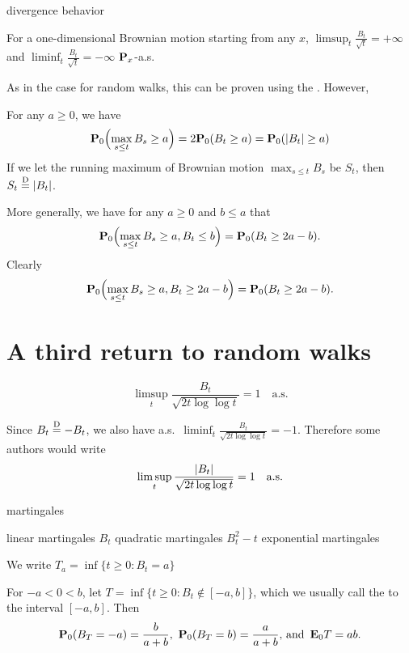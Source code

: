 divergence behavior
\begin{thm}
    For a one-dimensional Brownian motion starting from any $x$, 
    $\limsup_t \frac{B_t}{\sqrt t} = +\infty$ and $\liminf_t \frac{B_t}{\sqrt t} = -\infty$ $\mathbf{P}_x$-a.s.
\end{thm}

As in the case for random walks, this can be proven using the . However, 

\begin{namedthm}
    For any $a \geq 0$, we have 
    \[
        \mathbf{P}_0 \Bigl(\max_{s \leq t} B_s \geq a\Bigr) = 2\mathbf{P}_0(B_t \geq a) = \mathbf{P}_0(\lvert B_t \rvert \geq a)
    \]
    If we let the running maximum of Brownian motion $\max_{s\leq t} B_s$ be $S_t$, then $S_t \stackrel{\mathrm{D}}{=} \lvert B_t \rvert$.
\end{namedthm}

More generally, we have for any $a \geq 0$ and $b \leq a$ that \[
    \mathbf{P}_0\Bigl(\max_{s\leq t} B_s \geq a, B_t \leq b\Bigr) = \mathbf{P}_0(B_t \geq 2a - b).
\] Clearly \[
    \mathbf{P}_0\Bigl(\max_{s\leq t} B_s \geq a, B_t \geq 2a - b\Bigr) = \mathbf{P}_0(B_t \geq 2a - b).
\]

\section{A third return to random walks}




\begin{namedthm}
    \[
        \limsup_t \frac{B_t}{\sqrt{2t\log\log t}} = 1\quad \text{a.s.}
    \]
\end{namedthm}

Since $B_t \stackrel{\mathrm{D}}{=} -B_t$, we also have a.s.\ $\liminf_t \frac{B_t}{\sqrt{2t\log\log t}} = -1$. Therefore some authors would write \[
    \limsup_t \frac{\lvert B_t \rvert}{\sqrt{2t\log\log t}} = 1\quad \text{a.s.}
\]


martingales

linear martingales $B_t$ quadratic martingales $B_t^2 - t$ exponential martingales

We write $T_a = \inf\{t \geq 0: B_t = a\}$

\begin{thm}
    For $ - a< 0< b$, let $T = \inf\{t \geq 0 : B_t \notin [-a,b]\}$, which we usually call the  to the interval $[-a,b]$. Then \[
        \bP_0(B_T = -a) = \frac{b}{a+b},\ \bP_0(B_T = b) = \frac{a}{a+b} \text{, and } \bE_0 T = ab.
    \]
\end{thm}

